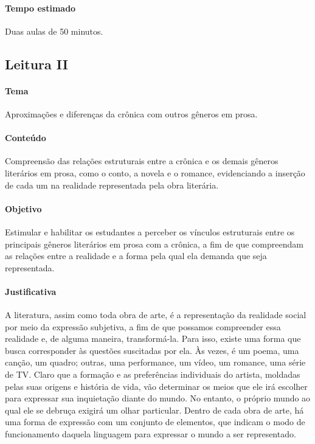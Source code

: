 \documentclass[12pt]{extarticle}
\begin{document}
\paragraph{Tempo estimado} Duas aulas de 50 minutos.

\subsection{Leitura II}


\paragraph{Tema} Aproximações e diferenças da crônica com outros gêneros em prosa.


\paragraph{Conteúdo} Compreensão das relações estruturais entre a crônica
e os demais gêneros literários em prosa, como o conto, a novela e o
romance, evidenciando a inserção de cada um na realidade
representada pela obra literária.

\paragraph{Objetivo} Estimular e habilitar os estudantes a perceber os
vínculos estruturais entre os principais gêneros literários em prosa com
a crônica, a fim de que compreendam as relações entre a realidade e a
forma pela qual ela demanda que seja representada.

\paragraph{Justificativa} A literatura, assim como toda obra de arte, é a 
representação da realidade social por meio da expressão subjetiva, a fim
de que possamos compreender essa realidade e, de alguma maneira,
transformá-la. Para isso, existe uma forma que busca corresponder às
questões suscitadas por ela. Às vezes, é um poema, uma canção, um
quadro; outras, uma performance, um vídeo, um romance, uma série de TV.
Claro que a formação e as preferências individuais do artista, moldadas
pelas suas origens e história de vida, vão determinar os meios que ele
irá escolher para expressar sua inquietação diante do mundo. No entanto,
o próprio mundo ao qual ele se debruça exigirá um olhar particular. 
Dentro de cada obra de arte, há uma forma de expressão com um conjunto de elementos,
que indicam o modo de funcionamento daquela linguagem para expressar o
mundo a ser representado.
\end{document}
